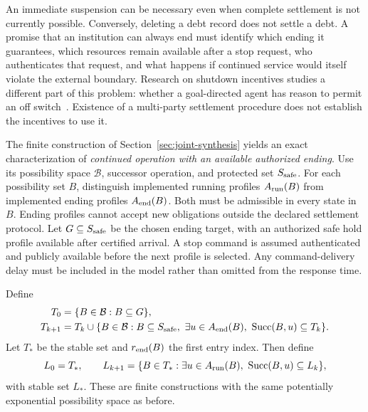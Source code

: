 \documentclass[11pt,letterpaper]{article}
\theoremstyle{plain}
\theoremstyle{definition}
\theoremstyle{remark}
\begin{document}
An immediate suspension can be necessary even when complete settlement is not currently possible. Conversely, deleting a debt record does not settle a debt. A promise that an institution can always end must identify which ending it guarantees, which resources remain available after a stop request, who authenticates that request, and what happens if continued service would itself violate the external boundary. Research on shutdown incentives studies a different part of this problem: whether a goal-directed agent has reason to permit an off switch~\cite{offswitch}. Existence of a multi-party settlement procedure does not establish the incentives to use it.

The finite construction of Section~\ref{sec:joint-synthesis} yields an exact characterization of \emph{continued operation with an available authorized ending}. Use its possibility space $\mathcal B$, successor operation, and protected set $S_{\rm safe}$. For each possibility set $B$, distinguish implemented running profiles $A_{\rm run}(B)$ from implemented ending profiles $A_{\rm end}(B)$. Both must be admissible in every state in $B$. Ending profiles cannot accept new obligations outside the declared settlement protocol. Let $G\subseteq S_{\rm safe}$ be the chosen ending target, with an authorized safe hold profile available after certified arrival. A stop command is assumed authenticated and publicly available before the next profile is selected. Any command-delivery delay must be included in the model rather than omitted from the response time.

Define
\begin{align}
 T_0&=\{B\in\mathcal B:B\subseteq G\},\label{eq:stop-target}\\
 T_{k+1}&=T_k\cup\{B\in\mathcal B:B\subseteq S_{\rm safe},\
      \exists u\in A_{\rm end}(B),\ \operatorname{Succ}(B,u)\subseteq T_k\}.
      \label{eq:stop-attractor}
\end{align}
Let $T_*$ be the stable set and $r_{\rm end}(B)$ the first entry index. Then define
\begin{equation}\label{eq:stoppable-kernel}
 L_0=T_*,\qquad
 L_{k+1}=\{B\in T_*:\exists u\in A_{\rm run}(B),\
                         \operatorname{Succ}(B,u)\subseteq L_k\},
\end{equation}
with stable set $L_*$. These are finite constructions with the same potentially exponential possibility space as before.
\end{document}
